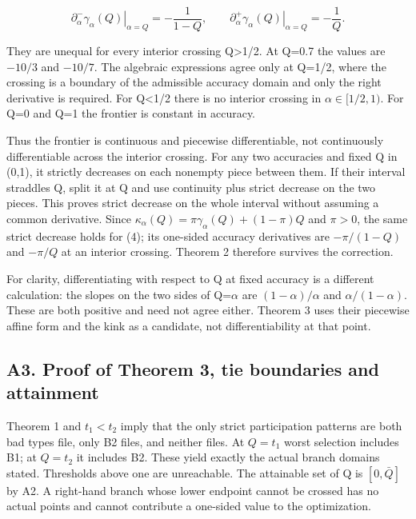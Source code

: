 \documentclass[
  11pt,
]{article}
\begin{document}
\[\left.\partial_\alpha^-\gamma_\alpha(Q)\right|_{\alpha=Q}=-\frac{1}{1-Q},\qquad
\left.\partial_\alpha^+\gamma_\alpha(Q)\right|_{\alpha=Q}=-\frac{1}{Q}. \tag{9}\]

They are unequal for every interior crossing Q\textgreater1/2. At Q=0.7
the values are \(-10/3\) and \(-10/7\). The algebraic expressions agree
only at Q=1/2, where the crossing is a boundary of the admissible
accuracy domain and only the right derivative is required. For
Q\textless1/2 there is no interior crossing in \(\alpha\in[1/2,1)\). For
Q=0 and Q=1 the frontier is constant in accuracy.

Thus the frontier is continuous and piecewise differentiable, not
continuously differentiable across the interior crossing. For any two
accuracies and fixed Q in (0,1), it strictly decreases on each nonempty
piece between them. If their interval straddles Q, split it at Q and use
continuity plus strict decrease on the two pieces. This proves strict
decrease on the whole interval without assuming a common derivative.
Since \(\kappa_\alpha(Q)=\pi\gamma_\alpha(Q)+(1-\pi)Q\) and \(\pi>0\),
the same strict decrease holds for (4); its one-sided accuracy
derivatives are \(-\pi/(1-Q)\) and \(-\pi/Q\) at an interior crossing.
Theorem 2 therefore survives the correction.

For clarity, differentiating with respect to Q at fixed accuracy is a
different calculation: the slopes on the two sides of Q=\(\alpha\) are
\((1-\alpha)/\alpha\) and \(\alpha/(1-\alpha)\). These are both positive
and need not agree either. Theorem 3 uses their piecewise affine form
and the kink as a candidate, not differentiability at that point.

\subsection{A3. Proof of Theorem 3, tie boundaries and
attainment}\label{a3.-proof-of-theorem-3-tie-boundaries-and-attainment}

Theorem 1 and \(t_1<t_2\) imply that the only strict participation
patterns are both bad types file, only B2 files, and neither files. At
\(Q=t_1\) worst selection includes B1; at \(Q=t_2\) it includes B2.
These yield exactly the actual branch domains stated. Thresholds above
one are unreachable. The attainable set of Q is \([0,\bar Q]\) by A2. A
right-hand branch whose lower endpoint cannot be crossed has no actual
points and cannot contribute a one-sided value to the optimization.
\end{document}
